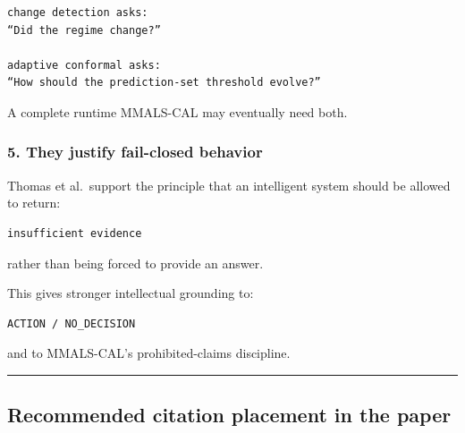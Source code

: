 \begin{lstlisting}
change detection asks:
“Did the regime change?”

adaptive conformal asks:
“How should the prediction-set threshold evolve?”
\end{lstlisting}

A complete runtime MMALS-CAL may eventually need both.

\subsubsection{5. They justify fail-closed behavior}\label{they-justify-fail-closed-behavior}

Thomas et al.~support the principle that an intelligent system should be allowed to return:

\begin{lstlisting}
insufficient evidence
\end{lstlisting}

rather than being forced to provide an answer.

This gives stronger intellectual grounding to:

\begin{lstlisting}
ACTION / NO_DECISION
\end{lstlisting}

and to MMALS-CAL's prohibited-claims discipline.

\begin{center}\rule{0.5\linewidth}{0.5pt}\end{center}

\subsection{Recommended citation placement in the paper}\label{recommended-citation-placement-in-the-paper}

